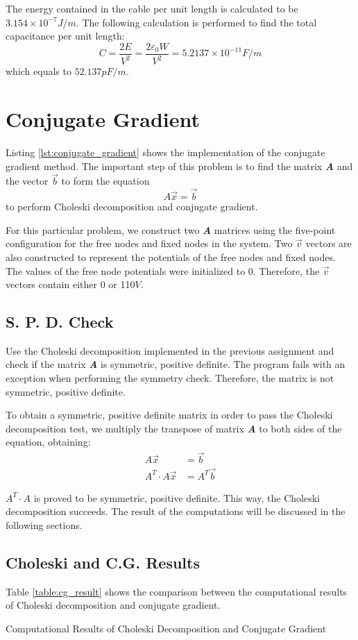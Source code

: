 \documentclass[a4paper,titlepage]{article}
\begin{document}
			The energy contained in the cable per unit length is calculated to be $3.154\times 10^{-7}J/m$. The following calculation is performed to find the total capacitance per unit length:
			$$
				C = \frac{2E}{V^2} = \frac{2\varepsilon_0 W}{V^2} = 5.2137\times 10^{-11}F/m
			$$
			which equals to $52.137pF/m$.
			
		\section{Conjugate Gradient}
			Listing \ref{lst:conjugate_gradient} shows the implementation of the conjugate gradient method. The important step of this problem is to find the matrix \textbf{\textit{A}} and the vector $\vec{b}$ to form the equation
			$$
				A\vec{x} = \vec{b}
			$$
			to perform Choleski decomposition and conjugate gradient.
			
			For this particular problem, we construct two \textbf{\textit{A}} matrices using the five-point configuration for the free nodes and fixed nodes in the system. Two $\vec{v}$ vectors are also constructed to represent the potentials of the free nodes and fixed nodes. The values of the free node potentials were initialized to 0. Therefore, the $\vec{v}$ vectors contain either 0 or 110$V$. 
			\subsection{S. P. D. Check}
				Use the Choleski decomposition implemented in the previous assignment and check if the matrix \textbf{\textit{A}} is symmetric, positive definite. The program fails with an exception when performing the symmetry check. Therefore, the matrix is not symmetric, positive definite. 
				
				To obtain a symmetric, positive definite matrix in order to pass the Choleski decomposition test, we multiply the transpose of matrix \textbf{\textit{A}} to both sides of the equation, obtaining:
				\begin{align*}
					A\vec{x} &= \vec{b}\\
					A^T \cdot A\vec{x} &= A^T\vec{b}
				\end{align*}
				
				$A^T \cdot A$ is proved to be symmetric, positive definite. This way, the Choleski decomposition succeeds. The result of the computations will be discussed in the following sections. 
			\subsection{Choleski and C.G. Results}	
				Table \ref{table:cg_result} shows the comparison between the computational results of Choleski decomposition and conjugate gradient.			
				\begin{table}[!htb]
					\centering
					\caption{Computational Results of Choleski Decomposition and Conjugate Gradient}
					\label{table:cg_result}
				\end{table}
			
\end{document}
